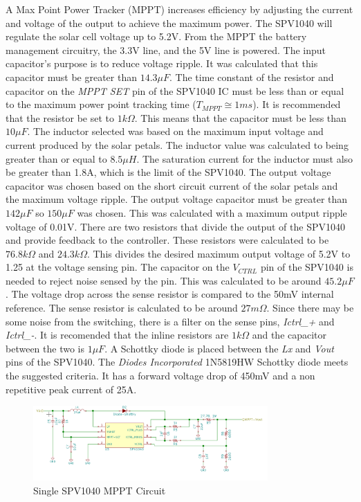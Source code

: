\documentclass{article}
\numberwithin{figure}{section}
\numberwithin{equation}{section}
\begin{document}
{A Max Point Power Tracker (MPPT) increases efficiency by adjusting the current and voltage of the output to achieve the maximum power. The SPV1040 will regulate the solar cell voltage up to 5.2V. From the MPPT the battery management circuitry, the 3.3V line, and the 5V line is powered. The input capacitor's purpose is to reduce voltage ripple. It was calculated that this capacitor must be greater than $14.3\mu F$. The time constant of the resistor and capacitor on the \textit{MPPT SET} pin of the SPV1040 IC must be less than or equal to the maximum power point tracking time ($T_{MPPT} \cong 1ms$). It is recommended that the resistor be set to $1k\Omega$. This means that the capacitor must be less than $10\mu F$. The inductor selected was based on the maximum input voltage and current produced by the solar petals. The inductor value was calculated to being greater than or equal to $8.5\mu H$. The saturation current for the inductor must also be greater than 1.8A, which is the limit of the SPV1040. The output voltage capacitor was chosen based on the short circuit current of the solar petals and the maximum voltage ripple. The output voltage capacitor must be greater than $142\mu F$ so $150 \mu F$ was chosen. This was calculated with a maximum output ripple voltage of 0.01V. There are two resistors that divide the output of the SPV1040 and provide feedback to the controller. These resistors were calculated to be $76.8k\Omega$ and $24.3k\Omega$. This divides the desired maximum output voltage of 5.2V to 1.25 at the voltage sensing pin. The capacitor on the $V_{CTRL}$ pin of the SPV1040 is needed to reject noise sensed by the pin. This was calculated to be around $45.2\mu F$. The voltage drop across the sense resistor is compared to the 50mV internal reference. The sense resistor is calculated to be around $27m\Omega$. Since there may be some noise from the switching, there is a filter on the sense pins, \textit{Ictrl\_+} and \textit{Ictrl\_-}. It is recomended that the inline resistors are $1k\Omega$ and the capacitor between the two is $1\mu F$. A Schottky diode is placed between the \textit{Lx} and \textit{Vout} pins of the SPV1040. The \textit{Diodes Incorporated} 1N5819HW Schottky diode meets the suggested criteria. It has a forward voltage drop of 450mV and a non repetitive peak current of 25A. 

\begin{figure}[H]
	\centering
	\includegraphics[width=0.8\textwidth]{singlempptcircuit}
	\caption{Single SPV1040 MPPT Circuit}
	\label{fig:singlemppt}
\end{figure}

}
\end{document}
